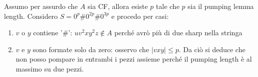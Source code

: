 \documentclass[italian]{article}
\newcommand{\len}[1]{\text{$|#1|$}}
\begin{document}
	\noindent
	Assumo per assurdo che $A$ sia CF, allora esiste $p$ tale che $p$ sia il pumping lemma length. Considero $S = 0^p\#0^{2p}\#0^{3p}$ e procedo per casi:
	\begin{enumerate}
		\item $v$ o $y$ contiene '$\#$': $uv^2xy^2z \notin A$ perché avrò più di due sharp nella stringa
		\item $v$ e $y$ sono formate solo da zero: osservo che $\len{vxy} \leq p$. Da ciò si deduce che non posso pompare in entrambi i pezzi assieme perché il pumping length è al massimo su due pezzi.
	\end{enumerate}
	
\end{document}
